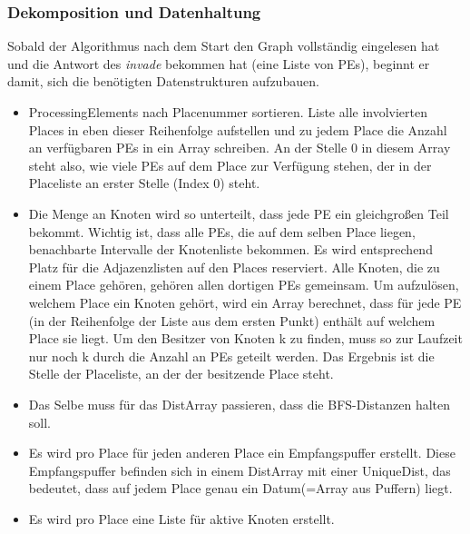 \subsubsection{Dekomposition und Datenhaltung} %
\label{ssub:dekomposition_und_datenhaltung}

Sobald der Algorithmus nach dem Start den Graph vollständig eingelesen hat und die Antwort des \textit{invade} bekommen hat (eine Liste von PEs), beginnt er damit, sich die benötigten Datenstrukturen aufzubauen.
\begin{itemize}
	\item ProcessingElements nach Placenummer sortieren. Liste alle involvierten Places in eben dieser Reihenfolge aufstellen und zu jedem Place die Anzahl an verfügbaren PEs in ein Array schreiben. An der Stelle 0 in diesem Array steht also, wie viele PEs auf dem Place zur Verfügung stehen, der in der Placeliste an erster Stelle (Index 0) steht.
	\item Die Menge an Knoten wird so unterteilt, dass jede PE ein gleichgroßen Teil bekommt. Wichtig ist, dass alle PEs, die auf dem selben Place liegen, benachbarte Intervalle der Knotenliste bekommen. Es wird entsprechend Platz für die Adjazenzlisten auf den Places reserviert. Alle Knoten, die zu einem Place gehören, gehören allen dortigen PEs gemeinsam. Um aufzulösen, welchem Place ein Knoten gehört, wird ein Array berechnet, dass für jede PE (in der Reihenfolge der Liste aus dem ersten Punkt) enthält auf welchem Place sie liegt. Um den Besitzer von Knoten k zu finden, muss so zur Laufzeit nur noch k durch die Anzahl an PEs geteilt werden. Das Ergebnis ist die Stelle der Placeliste, an der der besitzende Place steht.
	\item Das Selbe muss für das DistArray passieren, dass die BFS-Distanzen halten soll.
	\item Es wird pro Place für jeden anderen Place ein Empfangspuffer erstellt. Diese Empfangspuffer befinden sich in einem DistArray mit einer UniqueDist, das bedeutet, dass auf jedem Place genau ein Datum(=Array aus Puffern) liegt.
	\item Es wird pro Place eine Liste für aktive Knoten erstellt.
\end{itemize}

